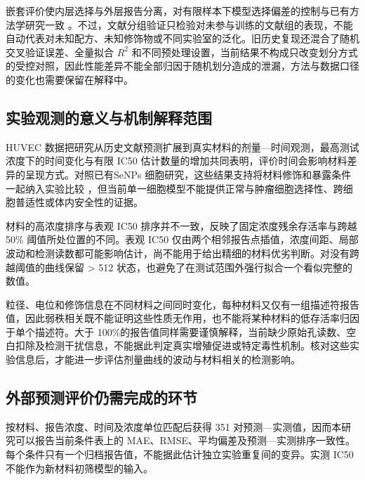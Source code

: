 嵌套评价使内层选择与外层报告分离，对有限样本下模型选择偏差的控制与已有方法学研究一致 \cite{cawley2010selection}。不过，文献分组验证只检验对未参与训练的文献组的表现，不能自动代表对未知配方、未知修饰物或不同实验室的泛化。旧历史复现还混合了随机交叉验证误差、全量拟合 $R^2$ 和不同预处理设置，当前结果不构成只改变划分方式的受控对照，因此性能差异不能全部归因于随机划分造成的泄漏，方法与数据口径的变化也需要保留在解释中。

\subsection{实验观测的意义与机制解释范围}

HUVEC 数据把研究从历史文献预测扩展到真实材料的剂量—时间观测，最高测试浓度下的时间变化与有限 IC50 估计数量的增加共同表明，评价时间会影响材料差异的呈现方式。对照已有SeNPs 细胞研究，这些结果支持将材料修饰和暴露条件一起纳入实验比较 \cite{wang2020prooxidation,lunkov2023chitosan}，但当前单一细胞模型不能提供正常与肿瘤细胞选择性、跨细胞普适性或体内安全性的证据。

材料的高浓度排序与表观 IC50 排序并不一致，反映了固定浓度残余存活率与跨越 50\% 阈值所处位置的不同。表观 IC50 仅由两个相邻报告点插值，浓度间距、局部波动和检测读数都可能影响估计，尚不能用于给出精细的材料优劣判断。对没有跨越阈值的曲线保留 > 512 状态，也避免了在测试范围外强行拟合一个看似完整的数值。

粒径、电位和修饰信息在不同材料之间同时变化，每种材料又仅有一组描述符报告值，因此弱秩相关既不能证明这些性质无作用，也不能将某种材料的低存活率归因于单个描述符。大于 100\%的报告值同样需要谨慎解释，当前缺少原始孔读数、空白扣除及检测干扰信息，不能据此判定真实增殖促进或特定毒性机制。核对这些实验信息后，才能进一步评估剂量曲线的波动与材料相关的检测影响。

\subsection{外部预测评价仍需完成的环节}

按材料、报告浓度、时间及浓度单位匹配后获得 351 对预测—实测值，因而本研究可以报告当前条件表上的 MAE、RMSE、平均偏差及预测—实测排序一致性。每个条件只有一个归档报告值，不能据此估计独立实验重复间的变异。实测 IC50 不能作为新材料初筛模型的输入。
